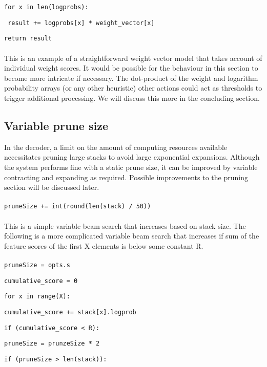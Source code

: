 \documentclass[11pt,letterpaper]{article}
\begin{document}
\noindent\texttt{\scriptsize{for x in len(logprobs):}}

\noindent\texttt{\scriptsize{   result += logprobs[x] * weight\_vector[x]}}

\noindent\texttt{\scriptsize{return result}}
\\ \\
This is an example of a straightforward weight vector model that takes account of individual weight scores. It would be possible for the behaviour in this section to become more intricate if necessary. The dot-product of the weight and logarithm probability arrays (or any other heuristic) other actions could act as thresholds to trigger additional processing. We will discuss this more in the concluding section.

\subsection{Variable prune size}

In the decoder, a limit on the amount of computing resources available necessitates pruning large stacks to avoid large exponential expansions. Although the system performs fine with a static prune size, it can be improved by variable contracting and expanding as required. Possible improvements to the pruning section will be discussed later.
\\ \\
\noindent\texttt{\scriptsize{pruneSize += int(round(len(stack) / 50))}}
\\ \\
This is a simple variable beam search that increases based on stack size. The following is a more complicated variable beam search that increases if sum of the feature scores of the first X elements is below some constant R.
\\ \\
\noindent\texttt{\scriptsize{pruneSize = opts.s}}

\noindent\texttt{\scriptsize{cumulative\_score = 0}}

\noindent\texttt{\scriptsize{for x in range(X):}}

\texttt{\scriptsize{cumulative\_score += stack[x].logprob}}

\noindent\texttt{\scriptsize{if (cumulative\_score < R): }}

\texttt{\scriptsize{pruneSize = prunzeSize * 2}}

\noindent\texttt{\scriptsize{if (pruneSize > len(stack)): }}
\end{document}
